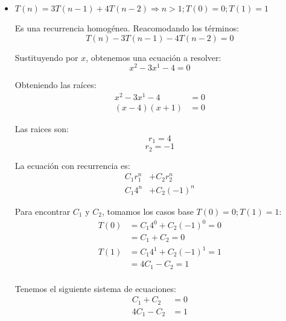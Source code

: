 \documentclass[12pt]{article}
\begin{document}
    \begin{itemize}
      \item $T(n) = 3T(n - 1) + 4T(n - 2) \Rightarrow n > 1; T(0) = 0; T(1) = 1 $

        Es una recurrencia homogénea. Reacomodando los términos:
        $$
          T(n) - 3T(n - 1) - 4T(n - 2) = 0
        $$
        
        Sustituyendo por $x$, obtenemos una ecuación a resolver:
        $$
          x^{2} - 3x^{1} -4 = 0
        $$

        Obteniendo las raíces:
        \begin{equation*}
          \begin{split}
            x^{2} - 3x^{1} - 4 & = 0 \\
            (x - 4)(x + 1) & = 0  
          \end{split}
        \end{equation*}

        Las raices son:
        $$ r_{1} = 4 $$
        $$ r_{2} = -1 $$

        La ecuación con recurrencia es:
        \begin{equation*}
          \begin{split}
            C_{1}r_{1}^{n} & + C_{2}r_{2}^{n} \\
            C_{1}4^{n} & + C_{2}(-1)^{n}
          \end{split}
        \end{equation*}

        Para encontrar $C_{1}$ y $C_{2}$, tomamos los casos base $ T(0) = 0; T(1) = 1 $:
        \begin{equation*}
          \begin{split}
            T(0) & = C_{1}4^{0} + C_{2}(-1)^{0} = 0   \\
                 & = C_{1} + C_{2} = 0                \\
            T(1) & = C_{1}4^{1} + C_{2}(-1)^{1} = 1   \\
                 & = 4C_{1} - C_{2} = 1                \\
          \end{split}
        \end{equation*}

        Tenemos el siguiente sistema de ecuaciones:
        \begin{equation*}
          \begin{split}
            C_{1} + C_{2} & = 0                \\
            4C_{1} - C_{2} & = 1 
          \end{split}
        \end{equation*}


\end{itemize}
\end{document}
